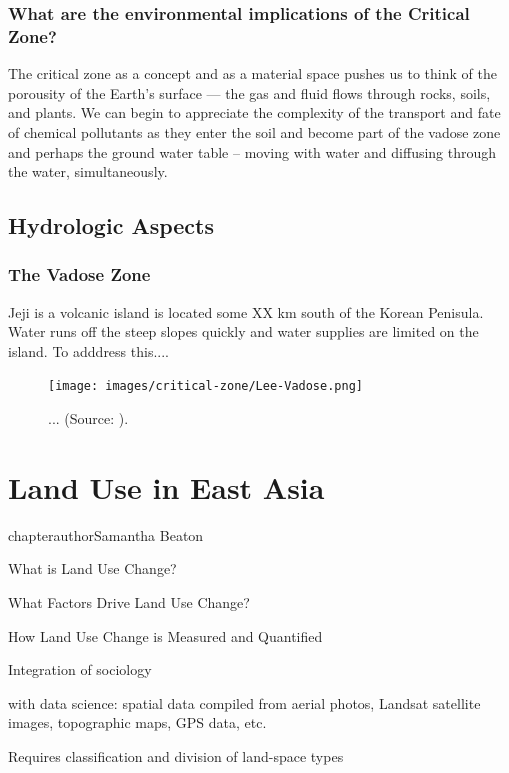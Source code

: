 \documentclass{book}\usepackage{knitr}
\begin{document}
\subsection{What are the environmental implications of the Critical Zone?}

The critical zone as a concept and as a material space pushes us to think of the porousity of the Earth's surface --- the gas and fluid flows through rocks, soils, and plants. We can begin to appreciate the complexity of the transport and fate of chemical pollutants as they enter the soil and become part of the vadose zone and perhaps the ground water table -- moving with water and diffusing through the water, simultaneously.

\section{Hydrologic Aspects}

\subsection{The Vadose Zone}

Jeji is a volcanic island is located some XX km south of the Korean Penisula. Water runs off the steep slopes quickly and water supplies are limited on the island. To adddress this...\citet{lee2017fifty}.

\begin{figure}
\texttt{[image: images/critical-zone/Lee-Vadose.png]}
\caption{... (Source: \citep{lee2017fifty}).}
\label{fig:vadose2}
\end{figure}



\chapter{Land Use in East Asia}

chapterauthor{Samantha Beaton}

What is Land Use Change?

What Factors Drive Land Use Change?

How Land Use Change is Measured and Quantified

Integration of sociology

with data science: spatial data compiled from aerial photos, Landsat satellite images, topographic maps, GPS data, etc.

Requires classification and division of land-space types
\end{document}
